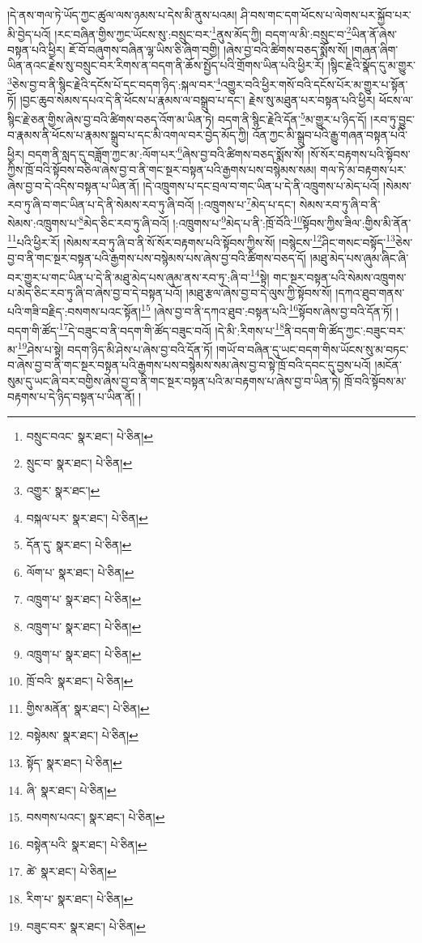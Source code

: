 །དེ་ནས་གལ་ཏེ་ཡོད་ཀྱང་ཚུལ་ལས་ཉམས་པ་དེས་མི་ནུས་པའམ། ཤི་བས་གང་དག་ཕོངས་པ་ལེགས་པར་སྐྱོབ་པར་མི་བྱེད་པའོ། །རང་བཞིན་གྱིས་ཀྱང་ཡོངས་སུ་:བསྲུང་བར་\footnote{བསྲུང་བའང་  སྣར་ཐང་།  པེ་ཅིན། }ནུས་མོད་ཀྱི། བདག་ལ་མི་:བསྲུང་བ་\footnote{སྲུང་བ་  སྣར་ཐང་།  པེ་ཅིན། }ཡིན་ནོ་ཞེས་བསྟན་པའི་ཕྱིར། ཇོ་བོ་བཞུགས་བཞིན་ལྷ་ཡིས་ཅི་ཞིག་བགྱི། །ཞེས་བྱ་བའི་ཚིགས་བཅད་སྨོས་སོ། །གཞན་ཞིག་ཡིན་ནའང་རྗེས་སུ་བསྲུང་བར་རིགས་ན་བདག་ནི་ཆོས་སྤྱོད་པའི་གྲོགས་ཡིན་པའི་ཕྱིར་རོ། །སྙིང་རྗེའི་སྣོད་དུ་མ་གྱུར་\footnote{འགྱུར་  སྣར་ཐང་། }ཅེས་བྱ་བ་ནི་སྙིང་རྗེའི་དངོས་པོ་དང་བདག་ཉིད་:སྐལ་བར་\footnote{བསྐལ་པར་  སྣར་ཐང་།  པེ་ཅིན། }འགྱུར་བའི་ཕྱིར་གསོ་བའི་དངོས་པོར་མ་གྱུར་པ་སྟོན་ཏོ། །བྱང་ཆུབ་སེམས་དཔའ་དེ་ནི་ཕོངས་པ་རྣམས་ལ་བསྒྲུབ་པ་དང་། རྗེས་སུ་མཐུན་པར་བསྟན་པའི་ཕྱིར། ཕོངས་ལ་སྙིང་རྗེ་ཅན་གྱིས་ཞེས་བྱ་བའི་ཚིགས་བཅད་འོག་མ་ཡིན་ཏེ། བདག་ནི་སྙིང་རྗེའི་དོན་\footnote{དོན་དུ་  སྣར་ཐང་།  པེ་ཅིན། }མ་གྱུར་པ་ཉིད་དོ། །རབ་ཏུ་བྱུང་བ་རྣམས་ནི་ཕོངས་པ་རྣམས་སྒྲུབ་པ་དང་མི་འགལ་བར་བྱེད་མོད་ཀྱི། འོན་ཀྱང་མི་སྒྲུབ་པའི་རྒྱུ་གཞན་བསྟན་པའི་ཕྱིར། བདག་ནི་སླད་དུ་བཟློག་ཀྱང་མ་:ལོག་པར་\footnote{ལོག་པ་  སྣར་ཐང་།  པེ་ཅིན། }ཞེས་བྱ་བའི་ཚིགས་བཅད་སྨོས་སོ། །སོ་སོར་བརྟགས་པའི་སྟོབས་ཀྱིས་ཁྲོ་བའི་སྟོབས་བཅིལ་ཞེས་བྱ་བ་ནི་གང་སྔར་བསྟན་པའི་རྒྱགས་པས་བསྙེམས་སམ། གལ་ཏེ་མ་བརྟགས་པར་ཞེས་བྱ་བ་དེ་འདིས་བསྟན་པ་ཡིན་ནོ། །དེ་འཁྲུགས་པ་དང་བྲལ་བ་གང་ཡིན་པ་དེ་ནི་འཁྲུགས་པ་མེད་པའོ། །སེམས་རབ་ཏུ་ཞི་བ་གང་ཡིན་པ་དེ་ནི་སེམས་རབ་ཏུ་ཞི་བའོ། །:འཁྲུགས་པ་\footnote{འཁྲུག་པ་  སྣར་ཐང་།  པེ་ཅིན། }མེད་པ་དང་། སེམས་རབ་ཏུ་ཞི་བ་ནི་སེམས་:འཁྲུགས་པ་\footnote{འཁྲུག་པ་  སྣར་ཐང་།  པེ་ཅིན། }མེད་ཅིང་རབ་ཏུ་ཞི་བའོ། །:འཁྲུགས་པ་\footnote{འཁྲུག་པ་  སྣར་ཐང་།  པེ་ཅིན། }མེད་པ་ནི་:ཁྲོ་བོའི་\footnote{ཁྲོ་བའི་  སྣར་ཐང་།  པེ་ཅིན། }སྟོབས་ཀྱིས་ཟིལ་:གྱིས་མི་ནོན་\footnote{གྱིས་མནོན་  སྣར་ཐང་།  པེ་ཅིན། }པའི་ཕྱིར་རོ། །སེམས་རབ་ཏུ་ཞི་བ་ནི་སོ་སོར་བརྟགས་པའི་སྟོབས་ཀྱིས་སོ། །བསྙེངས་\footnote{བསྟེམས་  སྣར་ཐང་།  པེ་ཅིན། }ཤིང་གསང་བསྟོད་\footnote{སྟོད་  སྣར་ཐང་།  པེ་ཅིན། }ཅེས་བྱ་བ་ནི་གང་སྔར་བསྟན་པའི་རྒྱགས་པས་བསྙེམས་པས་ཞེས་བྱ་བའི་ཚིགས་བཅད་དོ། །མཐུ་མེད་པས་ཞུམ་ཞིང་ཞི་བར་གྱུར་པ་གང་ཡིན་པ་དེ་ནི་མཐུ་མེད་པས་ཞུམ་ནས་རབ་ཏུ་:ཞི་བ་\footnote{ཞི་  སྣར་ཐང་།  པེ་ཅིན། }སྟེ། གང་སྔར་བསྟན་པའི་སེམས་འཁྲུགས་པ་མེད་ཅིང་རབ་ཏུ་ཞི་བ་ཞེས་བྱ་བ་དེ་བསྟན་པའོ། །མཐུ་རྩལ་ཞེས་བྱ་བ་དེ་ལུས་ཀྱི་སྟོབས་སོ། །དཀའ་ཐུབ་གནས་པའི་གཟི་བརྗིད་:བསགས་པའང་སྟོན།\footnote{བསགས་པའང་།  སྣར་ཐང་།  པེ་ཅིན། } །ཞེས་བྱ་བ་ནི་དཀའ་ཐུབ་:བསྟན་པའི་\footnote{བསྟེན་པའི་  སྣར་ཐང་།  པེ་ཅིན། }སྟོབས་ཞེས་བྱ་བའི་དོན་ཏོ། །བདག་གི་ཚོད་\footnote{ཚེ་  སྣར་ཐང་།  པེ་ཅིན། }དེ་བཟུང་བ་ནི་བདག་གི་ཚོད་བཟུང་བའོ། །དེ་མི་:རིགས་པ་\footnote{རིག་པ་  སྣར་ཐང་།  པེ་ཅིན། }ནི་བདག་གི་ཚོད་ཀྱང་:བཟུང་བར་མ་\footnote{བཟུང་བར་  སྣར་ཐང་།  པེ་ཅིན། }ཤེས་པ་སྟེ། བདག་ཉིད་མི་ཤེས་པ་ཞེས་བྱ་བའི་དོན་ཏོ། །གཡོ་བ་བཞིན་དུ་ཡང་བདག་གིས་ཡོངས་སུ་མ་བཏང་བ་ཞེས་བྱ་བ་ནི་གང་སྔར་བསྟན་པའི་རྒྱགས་པས་བསྙེམས་སམ་ཞེས་བྱ་བ་སྟེ་ཁྲོ་བའི་དབང་དུ་བྱས་པའོ། །མངོན་སུམ་དུ་ཡང་ཞི་བར་བགྱིས་ཞེས་བྱ་བ་ནི་གང་སྔར་བསྟན་པའི་མ་བརྟགས་པ་ཞེས་བྱ་བ་ཡིན་ཏེ། ཁྲོ་བའི་སྟོབས་མ་བརྟགས་པ་དེ་ཉིད་བསྟན་པ་ཡིན་ནོ། །
